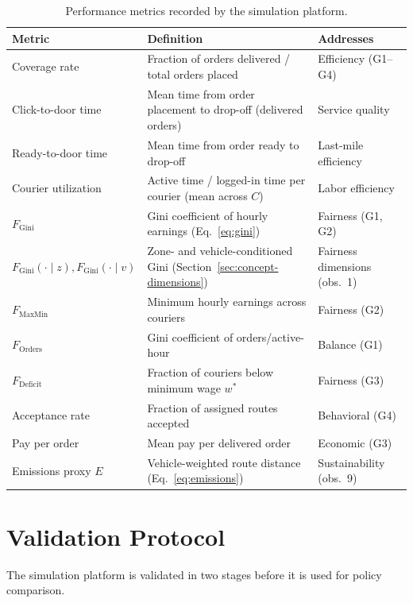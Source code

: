 \documentclass[12pt,a4paper]{report}
\begin{document}
\begin{table}[ht]
\centering
\caption{Performance metrics recorded by the simulation platform.}
\label{tab:metrics}
\small
\begin{tabularx}{\textwidth}{p{3.2cm}p{5.5cm}p{4.2cm}}
\toprule
\textbf{Metric} & \textbf{Definition} & \textbf{Addresses} \\
\midrule
Coverage rate & Fraction of orders delivered / total orders placed & Efficiency (G1--G4) \\
Click-to-door time & Mean time from order placement to drop-off (delivered orders) & Service quality \\
Ready-to-door time & Mean time from order ready to drop-off & Last-mile efficiency \\
Courier utilization & Active time / logged-in time per courier (mean across $C$) & Labor efficiency \\
$F_{\text{Gini}}$ & Gini coefficient of hourly earnings (Eq.~\ref{eq:gini}) & Fairness (G1, G2) \\
$F_{\text{Gini}}(\cdot\mid z), F_{\text{Gini}}(\cdot\mid v)$ & Zone- and vehicle-conditioned Gini (Section~\ref{sec:concept-dimensions}) & Fairness dimensions (obs.\ 1) \\
$F_{\text{MaxMin}}$ & Minimum hourly earnings across couriers & Fairness (G2) \\
$F_{\text{Orders}}$ & Gini coefficient of orders/active-hour & Balance (G1) \\
$F_{\text{Deficit}}$ & Fraction of couriers below minimum wage $w^*$ & Fairness (G3) \\
Acceptance rate & Fraction of assigned routes accepted & Behavioral (G4) \\
Pay per order & Mean pay per delivered order & Economic (G3) \\
Emissions proxy $E$ & Vehicle-weighted route distance (Eq.~\ref{eq:emissions}) & Sustainability (obs.\ 9) \\
\bottomrule
\end{tabularx}
\end{table}

\section{Validation Protocol}

The simulation platform is validated in two stages before it is used for policy comparison.
\end{document}
